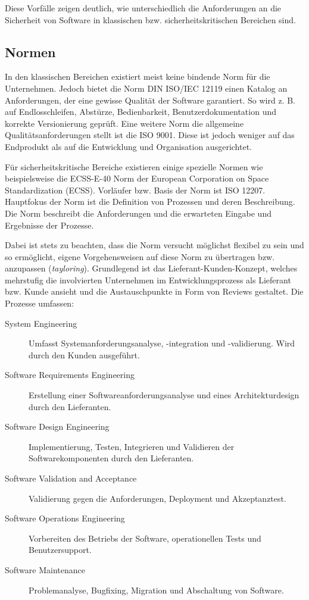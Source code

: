 Diese Vorfälle zeigen deutlich, wie unterschiedlich die Anforderungen an die Sicherheit von Software in klassischen bzw. sicherheitskritischen Bereichen sind.

\subsection{Normen} %

In den klassischen Bereichen existiert meist keine bindende Norm für die Unternehmen.
Jedoch bietet die Norm DIN ISO/IEC 12119 einen Katalog an Anforderungen, der eine gewisse Qualität der Software garantiert.
So wird z. B. auf Endlosschleifen, Abstürze, Bedienbarkeit, Benutzerdokumentation und korrekte Versionierung geprüft. 
Eine weitere Norm die allgemeine Qualitätsanforderungen stellt ist die ISO 9001.
Diese ist jedoch weniger auf das Endprodukt als auf die Entwicklung und Organisation ausgerichtet.
\parencite[Vgl.][S. 66 - 67]{Hohler:1998aa}


Für sicherheitskritische Bereiche existieren einige spezielle Normen wie beispielsweise die ECSS-E-40 Norm der European Corporation on Space Standardization (ECSS).
Vorläufer bzw. Basis der Norm ist ISO 12207.
Hauptfokus der Norm ist die Definition von Prozessen und deren Beschreibung. 
Die Norm beschreibt die Anforderungen und die erwarteten Eingabe und Ergebnisse der Prozesse.

Dabei ist stets zu beachten, dass die Norm versucht möglichst flexibel zu sein und so ermöglicht, eigene Vorgehensweisen auf diese Norm zu übertragen bzw. anzupassen (\emph{tayloring}).
Grundlegend ist das Lieferant-Kunden-Konzept, welches mehrstufig die involvierten Unternehmen im Entwicklungsprozess als Lieferant bzw. Kunde ansieht und die Austauschpunkte in Form von Reviews gestaltet.
Die Prozesse umfassen:
\begin{description}
\item[System Engineering] Umfasst Systemanforderungsanalyse, -integration und -validierung. 
Wird durch den Kunden ausgeführt.
\item[Software Requirements Engineering] Erstellung einer Softwareanforderungsanalyse und eines Architekturdesign durch den Lieferanten.
\item[Software Design Engineering] Implementierung, Testen, Integrieren und Validieren der Softwarekomponenten durch den Lieferanten.
\item[Software Validation and Acceptance] Validierung gegen die Anforderungen, Deployment und Akzeptanztest.
\item[Software Operations Engineering] Vorbereiten des Betriebs der Software, operationellen Tests und Benutzersupport.
\item[Software Maintenance] Problemanalyse, Bugfixing, Migration und Abschaltung von Software.
\end{description}

